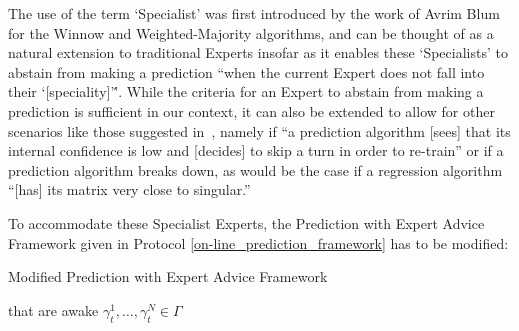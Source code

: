 The use of the term `Specialist' was first introduced by the work of Avrim Blum~\cite{blum:1997} for the Winnow and Weighted-Majority algorithms, and can be thought of as a natural extension to traditional Experts insofar as it enables these `Specialists' to abstain from making a prediction ``when the current Expert does not fall into their `[speciality]'\''. While the criteria for an Expert to abstain from making a prediction is sufficient in our context, it can also be extended to allow for other scenarios like those suggested in~\cite{kalnishkan:2022}, namely if ``a prediction algorithm [sees] that its internal confidence is low and [decides] to skip a turn in order to re-train'' or if a prediction algorithm breaks down, as would be the case if a regression algorithm ``[has] its matrix very close to singular.''

To accommodate these Specialist Experts, the Prediction with Expert Advice Framework given in Protocol \ref{on-line_prediction_framework} has to be modified:
\begin{protocol}[H]
    \caption{Modified Prediction with Expert Advice Framework}\label{protocol:modified_prediction_with_expert_advice}
    \begin{algorithmic}[1]
         that are awake
        $\gamma^1_t, \ldots, \gamma^N_t \in \Gamma$
    \end{algorithmic}
\end{protocol}

